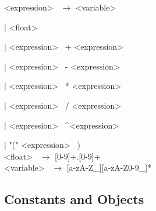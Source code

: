 \noindent
\textless expression\textgreater~ $\rightarrow$  \textless variable\textgreater~

\hspace{2cm} $|$ \textless float\textgreater~

\hspace{2cm} $|$ \textless expression\textgreater~ + \textless expression\textgreater~

\hspace{2cm} $|$ \textless expression\textgreater~ - \textless expression\textgreater~

\hspace{2cm} $|$ \textless expression\textgreater~ * \textless expression\textgreater~

\hspace{2cm} $|$ \textless expression\textgreater~ / \textless expression\textgreater~

\hspace{2cm} $|$ \textless expression\textgreater~ \textasciicircum \textless expression\textgreater~

\hspace{2cm} $|$ "(" \textless expression\textgreater~ ) \\



\noindent
\textless float\textgreater~ $\rightarrow$ [0-9]+.[0-9]+ \\



\noindent
\textless variable\textgreater~ $\rightarrow$ [a-zA-Z\_][a-zA-Z0-9\_]* \\

\subsection{Constants and Objects}

